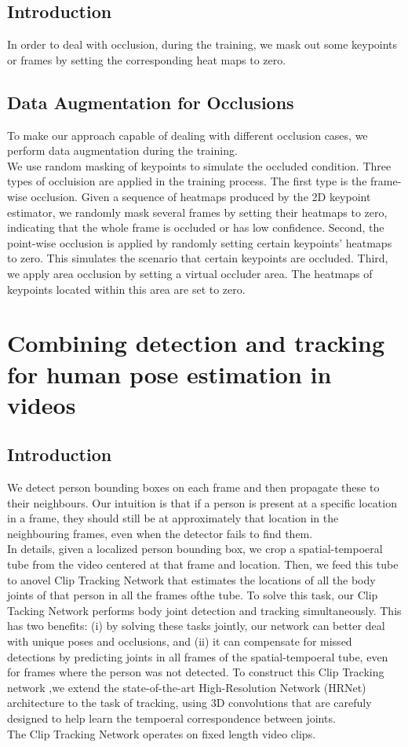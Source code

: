 \documentclass[a4paper]{report}
\begin{document}
\section*{Introduction}
In order to deal with occlusion, during the training, we mask out some keypoints or frames by setting the corresponding heat maps to zero.

\section*{Data Augmentation for Occlusions}
To make our approach capable of dealing with different occlusion cases, we perform data augmentation during the training.
\\
We use random masking of keypoints to simulate the occluded condition. Three types of occluision are applied in the training process. The first type is the frame-wise occlusion. Given a sequence of heatmaps produced by the 2D keypoint estimator, we randomly mask several frames by setting their heatmaps to zero, indicating that the whole frame is occluded or has low confidence. Second, the point-wise occlusion is applied by randomly setting certain keypoints' heatmaps to zero. This simulates the scenario that certain keypoints are occluded. Third, we apply area occlusion by setting a virtual occluder area. The heatmaps of keypoints located within this area are set to zero.

\chapter*{Combining detection and tracking for human pose estimation in videos}
\section*{Introduction}
We detect person bounding boxes on each frame and then propagate these to their neighbours. Our intuition is that if a person is present at a specific location in a frame, they should still be at approximately that location in the neighbouring frames, even when the detector fails to find them.
\\
In details, given a localized person bounding box, we crop a spatial-tempoeral tube from the video centered at that frame and location. Then, we feed this tube to anovel Clip Tracking Network that estimates the locations of all the body joints of that person in all the frames ofthe tube. To solve this task, our Clip Tacking Network performs body joint detection and tracking simultaneously. This has two benefits: (i) by solving these tasks jointly, our network can better deal with unique poses and occlusions, and (ii) it can compensate for missed detections by predicting joints in all frames of the spatial-tempoeral tube, even for frames where the person was not detected. To construct this Clip Tracking network ,we extend the state-of-the-art High-Resolution Network (HRNet) architecture to the task of tracking, using 3D convolutions that are carefuly designed to help learn the tempoeral correspondence between joints.
\\
The Clip Tracking Network operates on fixed length video clips.
\end{document}
